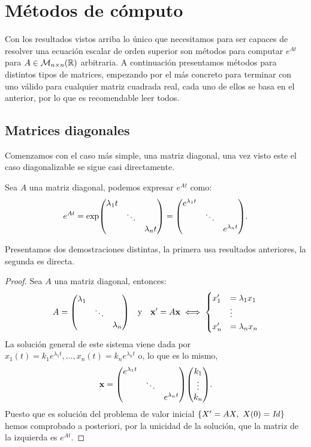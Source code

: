\documentclass[../ecuaciones_diferenciales.tex]{subfiles}
\begin{document}
\section{Métodos de cómputo}

Con los resultados vistos arriba lo único que necesitamos para ser capaces de
resolver una ecuación escalar de orden superior son métodos para computar 
\(e^{A t}\) para \(A \in \mathcal{M}_{n \times n}(\mathbb{R})\) arbitraria. 
A continuación presentamos métodos para distintos tipos de matrices, empezando
por el más concreto para terminar con uno válido para cualquier matriz cuadrada
real, cada uno de ellos se basa en el anterior, por lo que es recomendable
leer todos.

\subsection{Matrices diagonales}

Comenzamos con el caso más simple, una matriz diagonal, una vez visto este el
caso diagonalizable se sigue casi directamente.

\begin{proposition}
	Sea \(A\) una matriz diagonal, podemos expresar \(e^{At}\) como:
	\[e^{At} = \exp\mat{\lambda_1 t & & \\ & \ddots & \\ & & \lambda_n t}
		= \mat{e^{\lambda_1 t} & & \\ & \ddots & \\ & & e^{\lambda_n t}}.\]
\end{proposition}

Presentamos dos demostraciones distintas, la primera usa resultados anteriores,
la segunda es directa.

\begin{proof}
	Sea \(A\) una matriz diagonal, entonces:
	\[A = \mat{
			\lambda_1 & & \\
			& \ddots & \\
			& & \lambda_n}
		\quad \text{y} \quad
		\vec{x}' = A\vec{x} \iff
		\eqsys{
			x'_1 &= \lambda_1 x_1 \\
			&\vdots \\
			x'_n &= \lambda_n x_n \\
		}
	\]
	La solución general de este sistema viene dada por
	\(x_1(t) = k_1 e^{\lambda_1 t}, \dots, x_n(t) = k_n e^{\lambda_n t}\) o, 
	lo que es lo mismo,
	\[\vec{x} = \mat{e^{\lambda_1 t} & & \\ & \ddots & \\ & & e^{\lambda_n t}}
		\mat{k_1 \\ \vdots \\ k_n}.\]
	Puesto que es solución del problema de valor inicial
	\(\set{X' = AX,\ X(0) = \mathit{Id}}\) hemos comprobado a posteriori, por
	la unicidad de la solución, que la matriz de la izquierda es \(e^{At}\). 
\end{proof}
\end{document}
